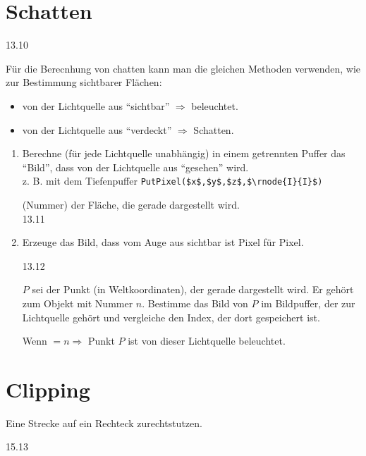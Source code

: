 \chapter{Schatten}
\begin{center}
 13.10
\end{center}
Für die Berecnhung von chatten kann man die gleichen Methoden verwenden, wie zur Bestimmung sichtbarer Flächen:
\begin{itemize}
 \item von der Lichtquelle aus "`sichtbar"' $\Rightarrow$ beleuchtet.
 \item von der Lichtquelle aus "`verdeckt"' $\Rightarrow$ Schatten.
\end{itemize}
\begin{enumerate}
 \item Berechne (für jede Lichtquelle unabhängig) in einem getrennten Puffer das "`Bild"', dass von der Lichtquelle aus
	"`gesehen"' wird.\\
	z. B. mit dem Tiefenpuffer \lstinline[mathescape=true]!PutPixel($x$,$y$,$z$,$\rnode{I}{I}$)!
	\begin{center}
	  (Nummer) der Fläche, die gerade dargestellt wird.
	 \\
	 13.11
	\end{center}
 \item Erzeuge das Bild, dass vom Auge aus sichtbar ist Pixel für Pixel.
	\begin{center}
	 13.12
	\end{center}
	$P$ sei der Punkt (in Weltkoordinaten), der gerade dargestellt wird. Er gehört zum Objekt mit Nummer $n$.
	Bestimme das Bild von $P$ im Bildpuffer, der zur Lichtquelle gehört und vergleiche den Index, der dort
	gespeichert ist.

	Wenn $= n \Rightarrow $ Punkt $P$ ist von dieser Lichtquelle beleuchtet.
\end{enumerate}
\chapter{Clipping}
Eine Strecke auf ein Rechteck zurechtstutzen.
\begin{center}
 15.13
\end{center}
